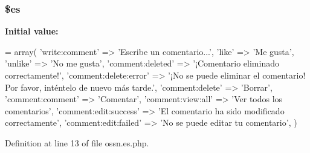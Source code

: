 \subsubsection[{\texorpdfstring{\$es}{$es}}]{\setlength{\rightskip}{0pt plus 5cm}\$es}\hypertarget{components_2_ossn_comments_2locale_2ossn_8es_8php_a388cbda27103d2baee3997798d1f2744}{}\label{components_2_ossn_comments_2locale_2ossn_8es_8php_a388cbda27103d2baee3997798d1f2744}
{\bfseries Initial value\+:}
\begin{DoxyCode}
= array(
    \textcolor{stringliteral}{'write:comment'} => \textcolor{stringliteral}{'Escribe un comentario...'},
    \textcolor{stringliteral}{'like'} => \textcolor{stringliteral}{'Me gusta'},
    \textcolor{stringliteral}{'unlike'} => \textcolor{stringliteral}{'No me gusta'},
    \textcolor{stringliteral}{'comment:deleted'} => \textcolor{stringliteral}{'¡Comentario eliminado correctamente!'},
    \textcolor{stringliteral}{'comment:delete:error'} => \textcolor{stringliteral}{'¡No se puede eliminar el comentario! Por favor, inténtelo de nuevo más
       tarde.'},
    \textcolor{stringliteral}{'comment:delete'} => \textcolor{stringliteral}{'Borrar'},
    \textcolor{stringliteral}{'comment:comment'} => \textcolor{stringliteral}{'Comentar'},
    \textcolor{stringliteral}{'comment:view:all'} => \textcolor{stringliteral}{'Ver todos los comentarios'},
    \textcolor{stringliteral}{'comment:edit:success'} => \textcolor{stringliteral}{'El comentario ha sido modificado correctamente'},
    \textcolor{stringliteral}{'comment:edit:failed'} => \textcolor{stringliteral}{'No se puede editar tu comentario'},
)
\end{DoxyCode}


Definition at line 13 of file ossn.\+es.\+php.

